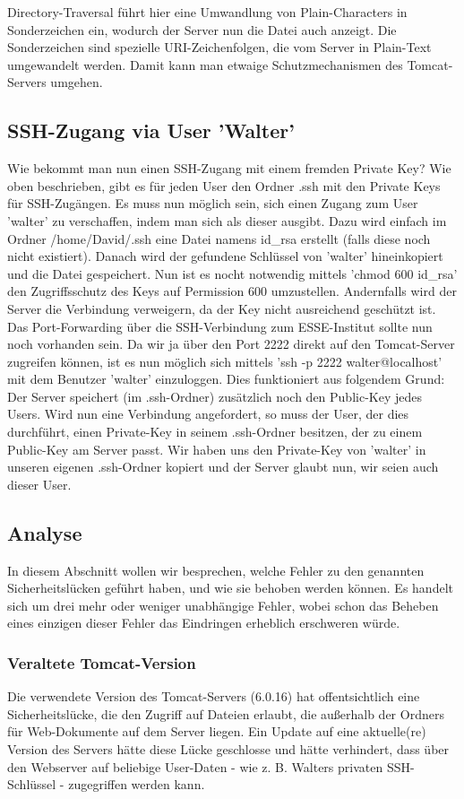 Directory-Traversal führt hier eine Umwandlung von Plain-Characters in Sonderzeichen ein, wodurch der Server nun die Datei auch
anzeigt. Die Sonderzeichen sind spezielle URI-Zeichenfolgen, die vom Server in Plain-Text umgewandelt werden. Damit kann
man etwaige Schutzmechanismen des Tomcat-Servers umgehen.

\subsection{SSH-Zugang via User 'Walter'}
Wie bekommt man nun einen SSH-Zugang mit einem fremden Private Key?
Wie oben beschrieben, gibt es für jeden User den Ordner .ssh mit den Private Keys für SSH-Zugängen. Es muss nun
möglich sein, sich einen Zugang zum User 'walter' zu verschaffen, indem man sich als dieser ausgibt. Dazu
wird einfach im Ordner /home/David/.ssh eine Datei namens id\_rsa erstellt (falls diese noch nicht existiert). Danach wird
der gefundene Schlüssel von 'walter' hineinkopiert und die Datei gespeichert. Nun ist es nocht notwendig mittels 'chmod
600 id\_rsa' den Zugriffsschutz des Keys auf Permission 600 umzustellen. Andernfalls wird der Server die Verbindung
verweigern, da der Key nicht ausreichend geschützt ist. Das Port-Forwarding über die SSH-Verbindung zum ESSE-Institut
sollte nun noch vorhanden sein. Da wir ja über den Port 2222 direkt auf den Tomcat-Server zugreifen können, ist es nun
möglich sich mittels 'ssh -p 2222 walter@localhost' mit dem Benutzer 'walter' einzuloggen. Dies funktioniert aus folgendem
Grund:\linebreak
Der Server speichert (im .ssh-Ordner) zusätzlich noch den Public-Key jedes Users. Wird nun eine Verbindung angefordert,
so muss der User, der dies durchführt, einen Private-Key in seinem .ssh-Ordner besitzen, der zu einem Public-Key am Server passt.
Wir haben uns den Private-Key von 'walter' in unseren eigenen .ssh-Ordner kopiert und der Server glaubt nun, wir seien
auch dieser User.

\subsection{Analyse}
In diesem Abschnitt wollen wir besprechen, welche Fehler zu den genannten Sicherheitslücken geführt haben, und wie sie behoben werden können. Es handelt sich um drei mehr oder weniger unabhängige Fehler, wobei schon das Beheben eines einzigen dieser Fehler das Eindringen erheblich erschweren würde.

\subsubsection{Veraltete Tomcat-Version}
Die verwendete Version des Tomcat-Servers (6.0.16) hat offentsichtlich eine Sicherheitslücke, die den Zugriff auf Dateien erlaubt, die außerhalb der Ordners für Web-Dokumente auf dem Server liegen. Ein Update auf eine aktuelle(re) Version des Servers hätte diese Lücke geschlosse und hätte verhindert, dass über den Webserver auf beliebige User-Daten - wie z. B. Walters privaten SSH-Schlüssel - zugegriffen werden kann.


